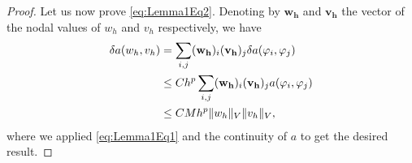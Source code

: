 \documentclass[10pt]{article}
\begin{document}
\begin{proof}
	
	Let us now prove \eqref{eq:Lemma1Eq2}. Denoting by $\mathbf{w_h}$ and $\mathbf{v_h}$ the vector of the nodal values of $w_h$ and $v_h$ respectively, we have
	\begin{equation}
	\begin{aligned}
		\delta a(w_h, v_h) &= \sum_{i,j} (\mathbf{w_h})_i(\mathbf{v_h})_j \delta a(\varphi_i, \varphi_j)\\
		&\leq Ch^p \sum_{i,j} (\mathbf{w_h})_i(\mathbf{v_h})_j a(\varphi_i, \varphi_j)\\
		&\leq CMh^p \lVert w_h\rVert_V \lVert v_h\rVert_V,
	\end{aligned}
	\end{equation}
	where we applied \eqref{eq:Lemma1Eq1} and the continuity of $a$ to get the desired result.
\end{proof}
\end{document}

